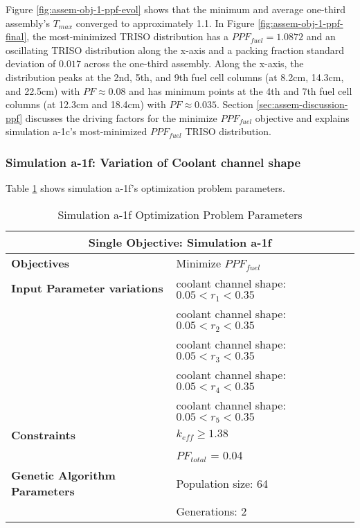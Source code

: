 Figure \ref{fig:assem-obj-1-ppf-evol} shows that the minimum and average 
one-third assembly's $T_{max}$ converged to approximately 1.1.
In Figure \ref{fig:assem-obj-1-ppf-final}, the most-minimized TRISO distribution has 
a $PPF_{fuel} = 1.0872$ and an oscillating TRISO distribution along the x-axis and a 
packing fraction standard deviation of $0.017$ across the one-third assembly. 
Along the x-axis, the distribution peaks at the 2nd, 5th, and 9th fuel 
cell columns (at 8.2cm, 14.3cm, and 22.5cm) with $PF\approx0.08$ and has minimum points
at the 4th and 7th fuel cell columns (at 12.3cm and 18.4cm) with $PF\approx0.035$. 
Section \ref{sec:assem-discussion-ppf} discusses the driving factors for the minimize 
$PPF_{fuel}$ objective and explains simulation a-1c's most-minimized $PPF_{fuel}$ 
TRISO distribution. 

\subsubsection{Simulation a-1f: Variation of Coolant channel shape}
Table \ref{tab:simulationa1f} shows simulation a-1f's optimization problem parameters. 
\begin{table}[htbp!]
    \centering
    \onehalfspacing
    \caption{Simulation a-1f Optimization Problem Parameters}
	\label{tab:simulationa1f}
    \footnotesize
    \begin{tabular}{l|p{6cm}}
    \hline 
    \multicolumn{2}{c}{\textbf{Single Objective: Simulation a-1f}} \\
    \hline 
    \textbf{Objectives} & Minimize $PPF_{fuel}$ \\
    \hline 
    \textbf{Input Parameter variations} 
    & coolant channel shape: $0.05<r_{1}<0.35$ \\
    & coolant channel shape: $0.05<r_{2}<0.35$ \\
    & coolant channel shape: $0.05<r_{3}<0.35$ \\
    & coolant channel shape: $0.05<r_{4}<0.35$ \\
    & coolant channel shape: $0.05<r_{5}<0.35$ \\
    \hline
    \textbf{Constraints} & $k_{eff} \geq 1.38$\\ 
    & $PF_{total}$ = 0.04 \\
    \hline 
    \textbf{Genetic Algorithm Parameters} & Population size: 64 \\
    & Generations: 2 \\
    \hline
    \end{tabular}
\end{table}

